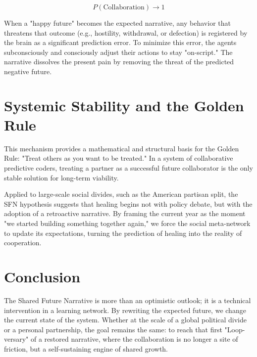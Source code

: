 \documentclass[11pt]{article}
\begin{document}
\[ P(\text{Collaboration}) \to 1 \]

When a "happy future" becomes the expected narrative, any behavior that threatens that outcome (e.g., hostility, withdrawal, or defection) is registered by the brain as a significant prediction error. To minimize this error, the agents subconsciously and consciously adjust their actions to stay "on-script." The narrative dissolves the present pain by removing the threat of the predicted negative future.

\section{Systemic Stability and the Golden Rule}
This mechanism provides a mathematical and structural basis for the Golden Rule: "Treat others as you want to be treated." In a system of collaborative predictive coders, treating a partner as a successful future collaborator is the only stable solution for long-term viability. 

Applied to large-scale social divides, such as the American partisan split, the SFN hypothesis suggests that healing begins not with policy debate, but with the adoption of a retroactive narrative. By framing the current year as the moment "we started building something together again," we force the social meta-network to update its expectations, turning the prediction of healing into the reality of cooperation.

\section{Conclusion}
The Shared Future Narrative is more than an optimistic outlook; it is a technical intervention in a learning network. By rewriting the expected future, we change the current state of the system. Whether at the scale of a global political divide or a personal partnership, the goal remains the same: to reach that first "Loop-versary" of a restored narrative, where the collaboration is no longer a site of friction, but a self-sustaining engine of shared growth.
\end{document}
